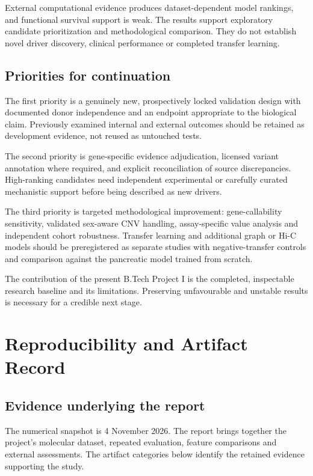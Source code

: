 \documentclass[12pt,a4paper,oneside]{report}
\begin{document}
External computational evidence produces dataset-dependent model rankings, and functional survival support is weak. The results support exploratory candidate prioritization and methodological comparison. They do not establish novel driver discovery, clinical performance or completed transfer learning.

\section{Priorities for continuation}
The first priority is a genuinely new, prospectively locked validation design with documented donor independence and an endpoint appropriate to the biological claim. Previously examined internal and external outcomes should be retained as development evidence, not reused as untouched tests.

The second priority is gene-specific evidence adjudication, licensed variant annotation where required, and explicit reconciliation of source discrepancies. High-ranking candidates need independent experimental or carefully curated mechanistic support before being described as new drivers.

The third priority is targeted methodological improvement: gene-callability sensitivity, validated sex-aware CNV handling, assay-specific value analysis and independent cohort robustness. Transfer learning and additional graph or Hi-C models should be preregistered as separate studies with negative-transfer controls and comparison against the pancreatic model trained from scratch.

The contribution of the present B.Tech Project I is the completed, inspectable research baseline and its limitations. Preserving unfavourable and unstable results is necessary for a credible next stage.

\appendix
\chapter{Reproducibility and Artifact Record}
\section{Evidence underlying the report}
The numerical snapshot is 4 November 2026. The report brings together the project's molecular dataset, repeated evaluation, feature comparisons and external assessments. The artifact categories below identify the retained evidence supporting the study.
\end{document}
